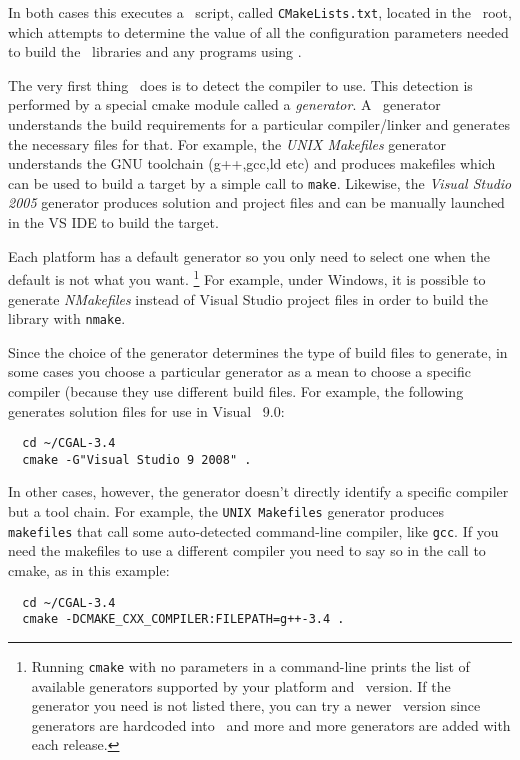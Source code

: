 In both cases this executes a  \cmake\ script, called
\texttt{CMakeLists.txt}, located in the \cgal\ root, which attempts to
determine the value of all the configuration parameters needed to build the
\cgal\ libraries and any programs using \cgal.

The very first thing \cmake\ does is to detect the compiler to use.
This detection is performed by a special cmake module called a {\em generator}. A
\cmake\ generator understands the build requirements for a particular compiler/linker
 and generates the necessary files for that. For example, the 
{\em UNIX Makefiles} generator understands the GNU toolchain (g++,gcc,ld etc) and produces makefiles
which can be used to build a target by a simple call to \texttt{make}.
Likewise, the {\em Visual Studio 2005} generator produces solution and project files and can be manually
launched in the VS IDE to build the target.

Each platform has a default generator so you only need to select one when the default is
not what you want. 
\footnote{Running \texttt{cmake} with no parameters in a command-line prints the list of available generators supported 
by your platform and \cmake\ version. If the generator you need is not listed there, you can
try a newer \cmake\ version since generators are hardcoded into \cmake\ and more and
more generators are added with each release.}
For example, under Windows, it is possible to generate {\em NMakefiles}
instead of Visual Studio project files in order to build the library with \texttt{nmake}.

Since the choice of the generator determines the type of build files to generate, in some cases
you choose a particular generator as a mean to choose a specific compiler (because they use different 
build files. For example, the following generates solution files for use in Visual \CC\ 9.0:

{\ccTexHtml{\scriptsize}{}
\begin{verbatim}
  cd ~/CGAL-3.4
  cmake -G"Visual Studio 9 2008" . 
\end{verbatim}
}

In other cases, however, the generator doesn't directly identify a specific compiler but a tool chain.
For example, the \texttt{UNIX Makefiles} generator produces \texttt{makefiles} that call some auto-detected
command-line compiler, like \texttt{gcc}. If you need the makefiles to use a different compiler you need to
say so in the call to cmake, as in this example:

{\ccTexHtml{\scriptsize}{}
\begin{verbatim}
  cd ~/CGAL-3.4
  cmake -DCMAKE_CXX_COMPILER:FILEPATH=g++-3.4 . 
\end{verbatim}
}



